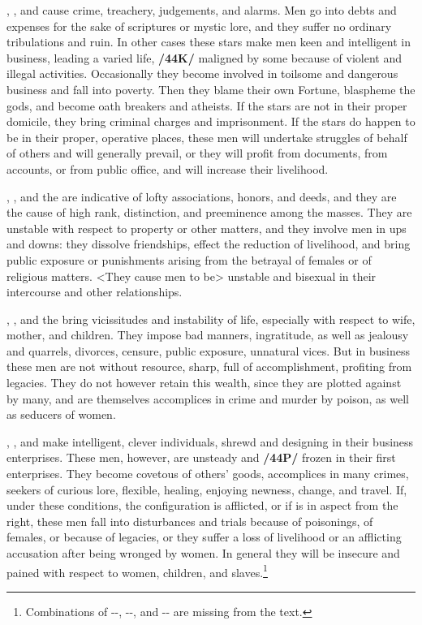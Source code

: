 \Saturn, \Mars, and \Mercury\xspace cause crime, treachery, judgements, and alarms. Men go into debts and expenses for the sake of scriptures or mystic lore, and they suffer no ordinary tribulations and ruin. In other cases these stars make men keen and intelligent in business, leading a varied life, \textbf{/44K/} maligned by some because of violent and illegal activities. Occasionally they become involved in toilsome and dangerous business and fall into poverty. Then they blame their own Fortune, blaspheme the gods, and become oath breakers and atheists. If the stars are not in their proper domicile, they bring criminal charges and imprisonment. If the stars do happen to be in their proper, operative places, these men will undertake struggles of behalf of others and will generally prevail, or they will profit from documents, from accounts, or from public office, and will increase their livelihood.

\Saturn, \Venus, and the \Sun\xspace are indicative of lofty associations, honors, and deeds, and they are the cause of high rank, distinction, and preeminence among the masses. They are unstable with respect to property or other matters, and they involve men in ups and downs: they dissolve friendships, effect the reduction of livelihood, and bring public exposure or punishments arising from the betrayal of females or of
religious matters. <They cause men to be> unstable and bisexual in their intercourse and other relationships.

\Saturn, \Venus, and the \Moon\xspace bring vicissitudes and instability of life, especially with respect to wife, mother, and children. They impose bad manners, ingratitude, as well as jealousy and quarrels, divorces, censure, public exposure, unnatural vices. But in business these men are not without resource, sharp, full of accomplishment, profiting from legacies. They do not however retain this wealth, since they are plotted against by many, and are themselves accomplices in crime and murder by poison, as well as seducers of women.

\Saturn, \Venus, and \Mercury\xspace make intelligent, clever individuals, shrewd and designing in their business enterprises. These men, however, are unsteady and \textbf{/44P/} frozen in their first enterprises. They become covetous of others’ goods, accomplices in many crimes, seekers of curious lore, flexible, healing, enjoying newness, change, and travel. If, under these conditions, the configuration is afflicted, or if \Mars\xspace is in aspect from the right, these men fall into disturbances and trials because of poisonings, of females, or because of legacies, or they suffer a loss of livelihood or an afflicting accusation after being wronged by women. In general they will be insecure and pained with respect to women, children, and slaves.\footnote{Combinations of \Saturn-\Mercury-\Sun, \Saturn-\Mercury-\Moon, and \Saturn-\Sun-\Moon\xspace are missing from the text.}

